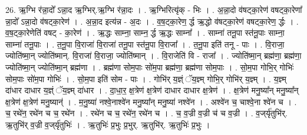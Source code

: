 \documentclass[17pt]{extarticle}
\begin{document}
26. ऋ॒ग्भि र॑न्ना॒दो᳚ ऽन्ना॒द ऋ॒ग्भिर्.ऋ॒ग्भि र॑न्ना॒दः । . ऋ॒ग्भिरित्यृ॑क् - भिः । . अ॒न्ना॒दो व॑षट्का॒रेण॑ वषट्का॒रेणा᳚ न्ना॒दो᳚ ऽन्ना॒दो व॑षट्का॒रेण॑ । . अ॒न्ना॒द इत्य॑न्न - अ॒दः । . व॒ष॒ट्का॒रेण॒ र्द्ध ऋ॒द्धो व॑षट्का॒रेण॑ वषट्का॒रेण॒ र्द्धः । . व॒ष॒ट्का॒रेणेति॑ वषट् - का॒रेण॑ । . ऋ॒द्धः साम्ना॒ साम्न॒ र्द्ध ऋ॒द्धः साम्ना᳚ । . साम्ना॑ तनू॒पा स्त॑नू॒पाः साम्ना॒ साम्ना॑ तनू॒पाः । . त॒नू॒पा वि॒राजा॑ वि॒राजा॑ तनू॒पा स्त॑नू॒पा वि॒राजा᳚ । . त॒नू॒पा इति॑ तनू - पाः । . वि॒राजा॒ ज्योति॑ष्मा॒न् ज्योति॑ष्मान्. वि॒राजा॑ वि॒राजा॒ ज्योति॑ष्मान् । . वि॒राजेति॑ वि - राजा᳚ । . ज्योति॑ष्मा॒न् ब्रह्म॑णा॒ ब्रह्म॑णा॒ ज्योति॑ष्मा॒न् ज्योति॑ष्मा॒न् ब्रह्म॑णा । . ब्रह्म॑णा सोम॒पाः सो॑म॒पा ब्रह्म॑णा॒ ब्रह्म॑णा सोम॒पाः । . सो॒म॒पा गोभि॒र् गोभिः॑ सोम॒पाः सो॑म॒पा गोभिः॑ । . सो॒म॒पा इति॑ सोम - पाः । . गोभि॑र् य॒ज्ञ्ं ॅय॒ज्ञ्म् गोभि॒र् गोभि॑र् य॒ज्ञ्म् । . य॒ज्ञ्म् दा॑धार दाधार य॒ज्ञ्ं ॅय॒ज्ञ्म् दा॑धार । . दा॒धा॒र॒ क्ष॒त्रेण॑ क्ष॒त्रेण॑ दाधार दाधार क्ष॒त्रेण॑ । . क्ष॒त्रेण॑ मनु॒ष्या᳚न् मनु॒ष्या᳚न् क्ष॒त्रेण॑ क्ष॒त्रेण॑ मनु॒ष्यान्॑ । . म॒नु॒ष्या॑ नश्वे॒नाश्वे॑न मनु॒ष्या᳚न् मनु॒ष्या॑ नश्वे॑न । . अश्वे॑न च॒ चाश्वे॒ना श्वे॑न च । . च॒ रथे॑न॒ रथे॑न च च॒ रथे॑न । . रथे॑न च च॒ रथे॑न॒ रथे॑न च । . च॒ व॒ज्री व॒ज्री च॑ च व॒ज्री । . व॒ज्‌र्यृ॑तुभि॑र्. ऋ॒तुभि॑र् व॒ज्री व॒ज्‌र्यृ॑तुभिः॑ । . ऋ॒तुभिः॑ प्र॒भुः प्र॒भुर्. ऋ॒तुभि॑र्. ऋ॒तुभिः॑ प्र॒भुः । \newline
\end{document}
